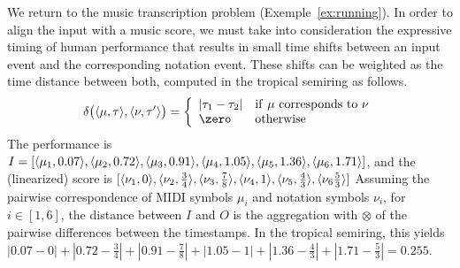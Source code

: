\begin{example}\label{distance-time}
We return to the music transcription problem (Exemple~\ref{ex:running}). In order to align the
input with a music score, we must take into consideration
the expressive timing of human performance that
results in small time shifts between an input event and the corresponding
notation event.  These shifts can be weighted as the time distance between both,
computed in the tropical semiring as follows.
$$\delta\bigl(\<\mu, \tau>, \<\nu, \tau'>\bigr) =
\left\{
\begin{array}{ll}
   | \tau_1 - \tau_2 | & \mathrm{if}\  \mu \rm{\ corresponds\  to\ } \nu \\
   \zero  & \mathrm{otherwise}
\end{array}
\right.$$
The performance is
$I = [ \<\mu_1, 0.07>, \<\mu_2, 0.72>, \<\mu_3, 0.91>, \<\mu_4, 1.05>, \<\mu_5, 1.36>, \<\mu_6, 1.71>]$,
and the (linearized) score is
$[\<\nu_1,0>, \<\nu_2,\frac{3}{4}>, \<\nu_3,\frac{7}{8}>, \<\nu_4,1>, \<\nu_5,\frac{4}{3}>, \<\nu_6\frac{5}{3}>]$
Assuming the pairwise correspondence of MIDI symbols
$\mu_i$ and notation symbols $\nu_i$, for $i \in [1, 6]$,
the distance between $I$ and $O$ is the  aggregation with $\otimes$
of the pairwise differences between the
timestamps. In the tropical semiring, this yields
$|0.07 - 0| + |0.72 - \frac{3}{4}| + |0.91- \frac{7}{8} | +
|1.05-1| + |1.36-\frac{4}{3}| + |1.71-\frac{5}{3}|= 0.255$.
\endex
\end{example}
